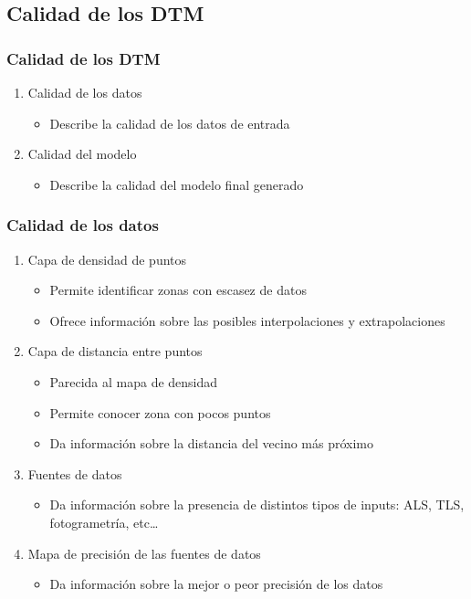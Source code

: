 \subsection[Calidad]{Calidad de los DTM}
\begin{frame}
  \frametitle{Calidad de los DTM}
  \begin{enumerate}
    \item<1-> \alert<1>{Calidad de los datos}
      \begin{itemize}
        \item Describe la calidad de los datos de entrada
      \end{itemize}
    \item<2-> \alert<2>{Calidad del modelo}
      \begin{itemize}
        \item Describe la calidad del modelo final generado
      \end{itemize}
  \end{enumerate}
\end{frame}
\begin{frame}
  \frametitle{Calidad de los datos}
  \begin{enumerate}
    \item Capa de densidad de puntos
      \begin{itemize}
        \item Permite identificar zonas con escasez de datos
        \item Ofrece información sobre las posibles interpolaciones y
          extrapolaciones
      \end{itemize}
    \item Capa de distancia entre puntos
      \begin{itemize}
        \item Parecida al mapa de densidad
        \item Permite conocer zona con pocos puntos
        \item Da información sobre la distancia del vecino más próximo
      \end{itemize}
    \item Fuentes de datos
      \begin{itemize}
        \item Da información sobre la presencia de distintos tipos de inputs:
          ALS, TLS, fotogrametría, etc\ldots
      \end{itemize}
    \item Mapa de precisión de las fuentes de datos
      \begin{itemize}
        \item Da información sobre la mejor o peor precisión de los datos
      \end{itemize}
  \end{enumerate}
\end{frame}
